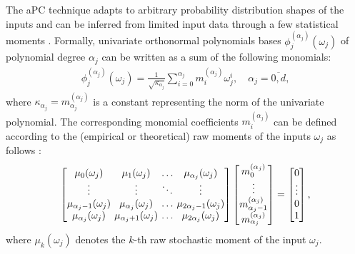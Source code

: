 \documentclass[a4paper,fleqn]{article}
\newcommand{\rw}[1]{\textcolor{blue}{#1}}
\newcommand{\del}[1]{\textcolor{red}{\sout{#1}}}
\renewcommand{\del}[1]{}
\renewcommand{\rw}[1]{#1}
\begin{document}
The aPC technique adapts to arbitrary probability distribution shapes of the inputs and can be inferred from limited input data through a few statistical moments \cite{OladNowak_RESS2012}. Formally, univariate orthonormal polynomials bases $\phi^{(\alpha_j)}_j(\omega_j)$ of polynomial degree $\alpha_j$ \del{could} \rw{can} be written as a sum of the following monomials:
%
\begin{eqnarray}
\label{poly_monomials}
  \phi^{(\alpha_j)}_j(\omega_j) = \frac{1}{\sqrt{\kappa_{\alpha_j}}}\sum_{i=0}^{\alpha_j} m^{(\alpha_j)}_i \omega_j^i, \quad \alpha_j=\overline{0,d},
\end{eqnarray}
where $\kappa_{\alpha_j}=m^{(\alpha_j)}_{\alpha_j}$ is a constant representing the norm of the univariate polynomial. The corresponding monomial coefficients $m^{(\alpha_j)}_i$ \del{could} \rw{can} be defined according to the (empirical or theoretical) raw moments of the inputs $\omega_j$ as \del{following} \rw{follows} \cite{OladNowak_RESS2012,oladyshkin2018incomplete}:
%
\begin{eqnarray}
\label{orth_matrix_dd}     
\begingroup
\setlength\arraycolsep{1.8pt}
\begin{bmatrix}   
\mu_0(\omega_j) & \mu_1(\omega_j) & \ldots & \mu_{\alpha_j}(\omega_j) \cr                
\vdots & \vdots & \ddots & \vdots \cr            
\mu_{\alpha_j-1}(\omega_j) & \mu_{\alpha_j}(\omega_j) & \ldots & \mu_{2\alpha_j-1}(\omega_j) \cr
\mu_{\alpha_j}(\omega_j) & \mu_{\alpha_j+1}(\omega_j) & \ldots & \mu_{2\alpha_j}(\omega_j) \cr
\end{bmatrix} 
\endgroup
\begin{bmatrix}      
m^{(\alpha_j)}_0 \cr                
\vdots \cr            
m^{(\alpha_j)}_{\alpha_j-1} \cr                
m^{(\alpha_j)}_{\alpha_j} \cr    
\end{bmatrix} 
=
\begin{bmatrix}
0 \cr                
\vdots \cr            
0 \cr                
1 \cr    
\end{bmatrix},
\end{eqnarray}
%
where $\mu_{k}(\omega_j)$ denotes the $k$-th raw stochastic moment of the input $\omega_j$. 
\end{document}
